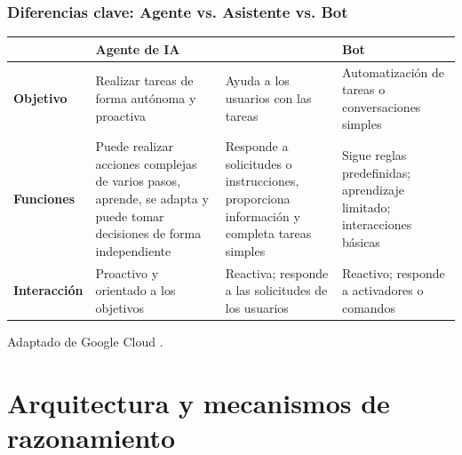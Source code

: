 \documentclass[handout]{beamer}
\begin{document}
\begin{frame}
  \frametitle{Diferencias clave: Agente vs. Asistente vs. Bot}
  
  \scriptsize 
  \renewcommand{\arraystretch}{1.4}

  \begin{tabularx}{\textwidth}{@{} >{\bfseries}l X X X @{}}
    \toprule
    & \textbf{Agente de IA} 
    & \textbf{\begin{tabular}{@{}c@{}}Asistente de IA\end{tabular}} 
    & \textbf{Bot} \\
    \midrule
    Objetivo    & Realizar tareas de forma autónoma y proactiva & Ayuda a los usuarios con las tareas & Automatización de tareas o conversaciones simples \\
    \addlinespace
    Funciones   & Puede realizar acciones complejas de varios pasos, aprende, se adapta y puede tomar decisiones de forma independiente & Responde a solicitudes o instrucciones, proporciona información y completa tareas simples & Sigue reglas predefinidas; aprendizaje limitado; interacciones básicas \\
    \addlinespace
    Interacción & Proactivo y orientado a los objetivos & Reactiva; responde a las solicitudes de los usuarios & Reactivo; responde a activadores o comandos \\
    \bottomrule
  \end{tabularx}
  
  \vspace{0.2cm}
  \scriptsize\raggedleft Adaptado de Google Cloud \textcite{googleCloudAgents}.
\end{frame}
\section{Arquitectura y mecanismos de razonamiento}
\end{document}
